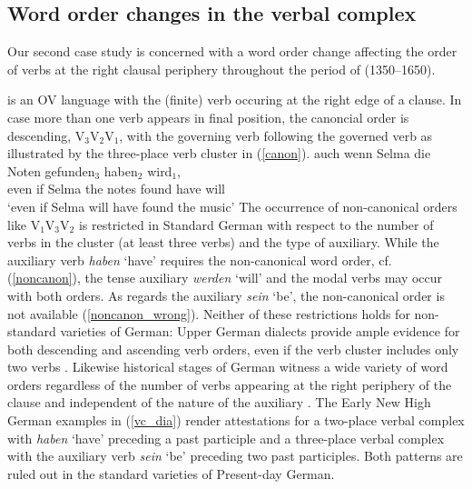 \documentclass[output=paper
                ,modfonts
                ,nonflat
	        ,collection
	        ,collectionchapter
	        ,collectiontoclongg
 	        ,biblatex
                ,babelshorthands
                ,newtxmath
                ,draftmode
                ,colorlinks, citecolor=brown
]{./langsci/langscibook}
\begin{document}
\subsection{Word order changes in the verbal complex \label{VC}} 

Our second case study is concerned with a word order change affecting the order of verbs at the right clausal periphery throughout the period of  (1350--1650). 

 is an OV language with the (finite) verb occuring at the right edge of a clause. In case more than one verb appears in final position, the canoncial order is descending, \ie V$_3$V$_2$V$_1$, with the governing verb following the governed verb as illustrated by the three-place verb cluster in (\ref{canon}). 
\ea \label{canon}
\gll auch wenn Selma die Noten gefunden$_3$ haben$_2$ wird$_1$, \\ even if Selma the notes found have will \\
\glt `even if Selma will have found the music'
\z
The occurrence of non-canonical orders like V$_1$V$_3$V$_2$ is restricted in Standard German with respect to the number of verbs in the cluster (at least three verbs) and the type of auxiliary. While the auxiliary verb \textit{haben} `have' requires the non-canonical word order, cf. (\ref{noncanon}), the tense auxiliary \textit{werden} `will' and the modal verbs may occur with both orders. As regards the auxiliary \textit{sein} `be', the non-canonical order is not available (\ref{noncanon_wrong}).  
\eal
{}
\zl
Neither of these restrictions holds for non-standard varieties of German: Upper German dialects provide ample evidence for both descending and ascending verb orders, even if the verb cluster includes only two verbs \citep{dubenion2010}. Likewise historical stages of German witness a wide variety of word orders regardless of the number of verbs appearing at the right periphery of the clause and independent of the nature of the auxiliary \citep{ebert1981,haerd1981,sapp2011}. The Early New High German examples in (\ref{vc_dia}) render attestations for a two-place verbal complex with \textit{haben} `have' preceding a past participle and a three-place verbal complex with the auxiliary verb \textit{sein} `be' preceding two past participles. Both patterns are ruled out in the standard varieties of Present-day German.
\end{document}
